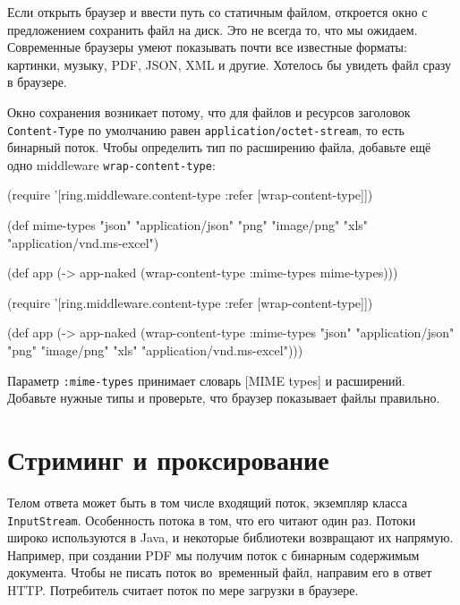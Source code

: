 Если открыть браузер и ввести путь со статичным файлом, откроется окно с
предложением сохранить файл на диск. Это не всегда то, что мы
ожидаем. Современные браузеры умеют показывать почти все известные форматы:
картинки, музыку, PDF, JSON, XML и другие. Хотелось бы увидеть файл сразу в
браузере.

Окно сохранения возникает потому, что для файлов и ресурсов заголовок
\verb|Content-Type| по умолчанию равен \texttt{appli\-cation/\-octet\--stream}, то есть
бинарный поток. Чтобы определить тип по расширению файла, добавьте ещё одно
middleware \verb|wrap-content-type|:

\ifnarrow

\begin{english}
  \begin{clojure}
(require '[ring.middleware.content-type
           :refer [wrap-content-type]])

(def mime-types
      {"json" "application/json"
       "png" "image/png"
       "xls" "application/vnd.ms-excel"})

(def app
  (-> app-naked
      (wrap-content-type
        {:mime-types mime-types})))
  \end{clojure}
\end{english}

\else

\begin{english}
  \begin{clojure}
(require '[ring.middleware.content-type
           :refer [wrap-content-type]])

(def app
  (-> app-naked
      (wrap-content-type
       {:mime-types
         {"json" "application/json"
          "png" "image/png"
          "xls" "application/vnd.ms-excel"}})))
  \end{clojure}
\end{english}

\fi

Параметр \verb|:mime-types| принимает словарь
[MIME types] и
расширений. Добавьте нужные типы и проверьте, что браузер показывает файлы
правильно.


\section{Стриминг и проксирование}

Телом ответа может быть в том числе входящий поток, экземпляр класса
\verb|InputStream|. Особенность потока в том, что его читают один раз. Потоки
широко используются в Java, и некоторые библиотеки возвращают их
напрямую. Например, при создании PDF мы получим поток с бинарным содержимым
документа. Чтобы не писать поток во~временный файл, направим его в ответ
HTTP. Потребитель считает поток по мере загрузки в браузере.

